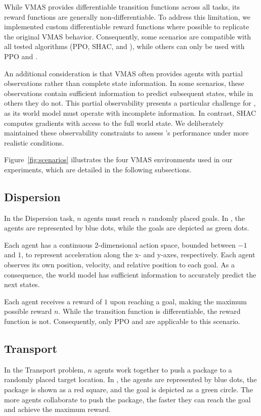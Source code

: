 While VMAS provides differentiable transition functions across all tasks, its reward functions are generally non-differentiable. To address this limitation, we implemented custom differentiable reward functions where possible to replicate the original VMAS behavior. Consequently, some scenarios are compatible with all tested algorithms (PPO, SHAC, and \fname{}), while others can only be used with PPO and \fname{}.

An additional consideration is that VMAS often provides agents with partial observations rather than complete state information. In some scenarios, these observations contain sufficient information to predict subsequent states, while in others they do not. This partial observability presents a particular challenge for \fname{}, as its world model must operate with incomplete information. In contrast, SHAC computes gradients with access to the full world state. We deliberately maintained these observability constraints to assess \fname{}'s performance under more realistic conditions.

Figure~\ref{fig:scenarios} illustrates the four VMAS environments used in our experiments, which are detailed in the following subsections.

\subsection{Dispersion}
In the Dispersion task, $n$ agents must reach $n$ randomly placed goals. In , the agents are represented by blue dots, while the goals are depicted as green dots.

Each agent has a continuous 2-dimensional action space, bounded between $-1$ and $1$, to represent acceleration along the x- and y-axes, respectively. Each agent observes its own position, velocity, and relative position to each goal. As a consequence, the world model has sufficient information to accurately predict the next states.

Each agent receives a reward of $1$ upon reaching a goal, making the maximum possible reward $n$. While the transition function is differentiable, the reward function is not. Consequently, only PPO and \fname{} are applicable to this scenario.

\subsection{Transport}
In the Transport problem, $n$ agents work together to push a package to a randomly placed target location. In , the agents are represented by blue dots, the package is shown as a red square, and the goal is depicted as a green circle. The more agents collaborate to push the package, the faster they can reach the goal and achieve the maximum reward.

